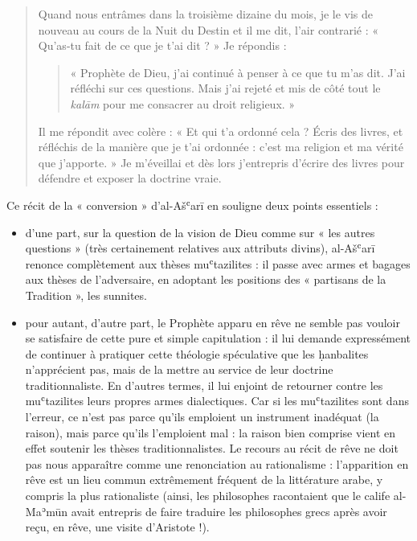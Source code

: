 \begin{quote}
Quand nous entrâmes dans la troisième dizaine du mois, je le vis de
nouveau au cours de la Nuit du Destin et il me dit,
l'air contrarié : « Qu'as-tu fait de ce que je t'ai dit ? » Je répondis
:
\begin{quote}
    « Prophète de Dieu, j'ai continué à penser à ce que tu m'as dit. J'ai
réfléchi sur ces questions. Mais j'ai rejeté et mis de côté tout le
\emph{kalām} pour me consacrer au droit religieux. »
\end{quote}
 Il me répondit avec
colère : « Et qui t'a ordonné cela ? Écris des livres, et réfléchis de
la manière que je t'ai ordonnée : c'est ma religion et ma vérité que
j'apporte. » Je m'éveillai et dès lors j'entrepris d'écrire des livres
pour défendre et exposer la doctrine vraie.
\end{quote}



Ce récit de la « conversion » d'al-Ašʿarī en souligne deux points
essentiels :


\begin{itemize}
\item
  
  d'une part, sur la question de la vision de Dieu comme sur « les
  autres questions » (très certainement relatives aux attributs divins),
  al-Ašʿarī renonce complètement aux thèses muʿtazilites : il passe avec
  armes et bagages aux thèses de l'adversaire, en adoptant les positions
  des « partisans de la Tradition », les sunnites.
  
\item
  
  pour autant, d'autre part, le Prophète apparu en rêve ne semble pas
  vouloir se satisfaire de cette pure et simple capitulation : il lui
  demande expressément de continuer à pratiquer cette théologie
  spéculative que les ḥanbalites n'apprécient pas, mais de la mettre au
  service de leur doctrine traditionnaliste. En d'autres termes, il lui
  enjoint de retourner contre les muʿtazilites leurs propres armes
  dialectiques. Car si les muʿtazilites sont dans l'erreur, ce n'est pas
  parce qu'ils emploient un instrument inadéquat (la raison), mais parce
  qu'ils l'emploient mal : la raison bien comprise vient en effet
  soutenir les thèses traditionnalistes. Le recours au récit de rêve ne
  doit pas nous apparaître comme une renonciation au rationalisme :
  l'apparition en rêve est un lieu commun extrêmement fréquent de la
  littérature arabe, y compris la plus rationaliste (ainsi, les
  philosophes racontaient que le calife al-Maʾmūn avait entrepris de
  faire traduire les philosophes grecs après avoir reçu, en rêve, une
  visite d'Aristote !).
  
\end{itemize}

